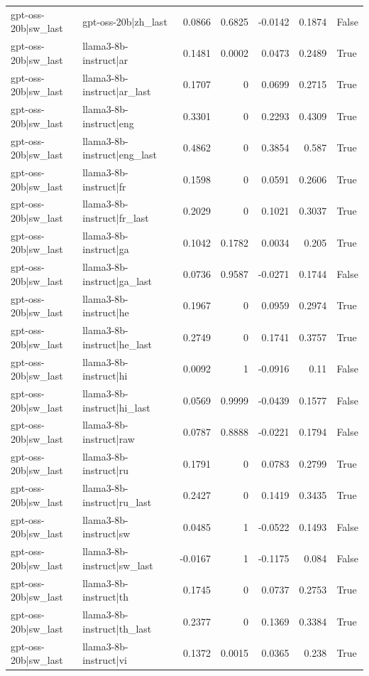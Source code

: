 \begin{table}
\begin{tabular}{l l r r r r l}
gpt-oss-20b|sw_last & gpt-oss-20b|zh_last & 0.0866 & 0.6825 & -0.0142 & 0.1874 & False \\
gpt-oss-20b|sw_last & llama3-8b-instruct|ar & 0.1481 & 0.0002 & 0.0473 & 0.2489 & True \\
gpt-oss-20b|sw_last & llama3-8b-instruct|ar_last & 0.1707 & 0 & 0.0699 & 0.2715 & True \\
gpt-oss-20b|sw_last & llama3-8b-instruct|eng & 0.3301 & 0 & 0.2293 & 0.4309 & True \\
gpt-oss-20b|sw_last & llama3-8b-instruct|eng_last & 0.4862 & 0 & 0.3854 & 0.587 & True \\
gpt-oss-20b|sw_last & llama3-8b-instruct|fr & 0.1598 & 0 & 0.0591 & 0.2606 & True \\
gpt-oss-20b|sw_last & llama3-8b-instruct|fr_last & 0.2029 & 0 & 0.1021 & 0.3037 & True \\
gpt-oss-20b|sw_last & llama3-8b-instruct|ga & 0.1042 & 0.1782 & 0.0034 & 0.205 & True \\
gpt-oss-20b|sw_last & llama3-8b-instruct|ga_last & 0.0736 & 0.9587 & -0.0271 & 0.1744 & False \\
gpt-oss-20b|sw_last & llama3-8b-instruct|he & 0.1967 & 0 & 0.0959 & 0.2974 & True \\
gpt-oss-20b|sw_last & llama3-8b-instruct|he_last & 0.2749 & 0 & 0.1741 & 0.3757 & True \\
gpt-oss-20b|sw_last & llama3-8b-instruct|hi & 0.0092 & 1 & -0.0916 & 0.11 & False \\
gpt-oss-20b|sw_last & llama3-8b-instruct|hi_last & 0.0569 & 0.9999 & -0.0439 & 0.1577 & False \\
gpt-oss-20b|sw_last & llama3-8b-instruct|raw & 0.0787 & 0.8888 & -0.0221 & 0.1794 & False \\
gpt-oss-20b|sw_last & llama3-8b-instruct|ru & 0.1791 & 0 & 0.0783 & 0.2799 & True \\
gpt-oss-20b|sw_last & llama3-8b-instruct|ru_last & 0.2427 & 0 & 0.1419 & 0.3435 & True \\
gpt-oss-20b|sw_last & llama3-8b-instruct|sw & 0.0485 & 1 & -0.0522 & 0.1493 & False \\
gpt-oss-20b|sw_last & llama3-8b-instruct|sw_last & -0.0167 & 1 & -0.1175 & 0.084 & False \\
gpt-oss-20b|sw_last & llama3-8b-instruct|th & 0.1745 & 0 & 0.0737 & 0.2753 & True \\
gpt-oss-20b|sw_last & llama3-8b-instruct|th_last & 0.2377 & 0 & 0.1369 & 0.3384 & True \\
gpt-oss-20b|sw_last & llama3-8b-instruct|vi & 0.1372 & 0.0015 & 0.0365 & 0.238 & True \\

\end{tabular}
\end{table}
